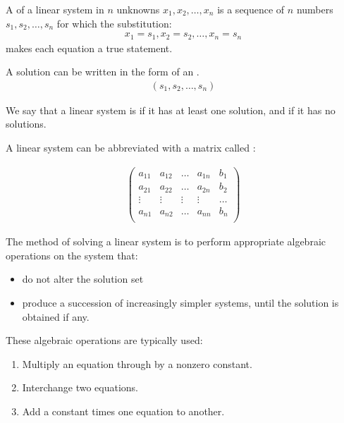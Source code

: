     \par A  of a linear system in $n$ unknowns
    $x_{1}, x_{2}, \ldots, x_{n}$ is a sequence of $n$ numbers
    $s_{1}, s_{2}, \ldots, s_{n}$ for which the substitution:
    \begin{align*}
      x_{1} = s_{1}, x_{2} = s_{2}, \ldots, x_{n} = s_{n}
    \end{align*}
    makes each equation a true statement.
    \par A solution can be written in the form of an .
    \begin{align*}
      (s_{1}, s_{2}, \ldots, s_{n})
    \end{align*}

    \par We say that a linear system is  if it has at least
    one solution, and  if it has no solutions.


    \par A linear system can be abbreviated with a matrix called
    :

    \begin{align*}
      \begin{pmatrix}
        a_{11} & a_{12} & \ldots & a_{1n} & b_{1} \\
        a_{21} & a_{22} & \ldots & a_{2n} & b_{2} \\
        \vdots & \vdots & \vdots & \vdots & \ldots \\
        a_{n1} & a_{n2} & \ldots & a_{nn} & b_{n} \\
      \end{pmatrix}
    \end{align*}

    \par The method of solving a linear system is to perform appropriate
    algebraic operations on the system that:
    \begin{itemize}
      \item do not alter the solution set 
      \item produce a succession of increasingly simpler systems, until
        the solution is obtained if any.
    \end{itemize}
    \par These algebraic operations are typically used:
    \begin{enumerate}
      \item Multiply an equation through by a nonzero constant.
      \item Interchange two equations.
      \item Add a constant times one equation to another.
    \end{enumerate}

